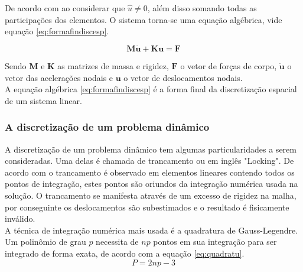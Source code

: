  De acordo com \cite{Paulo} ao considerar que  $ \hat{u} \neq 0 $, além disso somando todas as participações dos elementos. O sistema torna-se uma equação algébrica, vide equação \ref{eq:formafindiscesp}.

\begin{equation} \label{eq:formafindiscesp}
    \boldsymbol{M \ddot{u} } + \boldsymbol{Ku} = \boldsymbol{F}
\end{equation}

Sendo $ \boldsymbol{M} $ e $ \boldsymbol{K} $ as matrizes de massa e rigidez, $\boldsymbol{F}$ o vetor de forças de corpo, $ \boldsymbol{\ddot{u}} $ o vetor das acelerações nodais e $\boldsymbol{u}$ o vetor de deslocamentos nodais.\\

A equação algébrica \ref{eq:formafindiscesp} é a forma final da discretização espacial de um sistema linear.

\subsubsection{A discretização de um problema dinâmico}

A discretização de um problema dinâmico tem algumas particularidades a serem consideradas. Uma delas é chamada de trancamento ou em inglês "Locking". De acordo com \cite{Paulo} o trancamento é observado em elementos lineares contendo todos os pontos de integração, estes pontos são oriundos da integração numérica usada na solução. O trancamento se manifesta através de um excesso de rigidez na malha, por conseguinte os deslocamentos são subestimados e o resultado é fisicamente inválido. \\

A técnica de integração numérica mais usada é a quadratura de Gauss-Legendre. Um polinômio de grau $p$ necessita de $np$ pontos em sua integração para ser integrado de forma exata, de acordo com a equação \ref{eq:quadratu}. 
\begin{equation} \label{eq:quadratu}
    P=2np-3
\end{equation}

